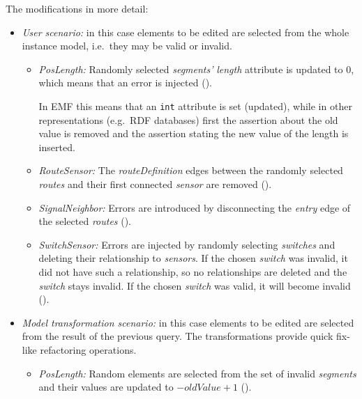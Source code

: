 The modifications in more detail:
\begin{itemize}
  \item \emph{User scenario:} in this case elements to be edited are selected from the whole instance model, i.e.\ they may be valid or invalid. 
  \begin{itemize}
    
    \item \emph{PosLength:} Randomly selected \emph{segments'} \emph{length} attribute is updated to 0, which means that an error is injected ().
    
    In EMF this means that an \texttt{int} attribute is set (updated), while in other representations (e.g.\ RDF databases) first the assertion about the old value is removed and the assertion stating the new value of the length is inserted.
    
    \item \emph{RouteSensor:} The \emph{routeDefinition} edges between the randomly selected \emph{routes} and their first connected \emph{sensor} are removed ().
    
    \item \emph{SignalNeighbor:} Errors are introduced by disconnecting the \emph{entry} edge of the selected \emph{routes} ().

    \item \emph{SwitchSensor:} Errors are injected by randomly selecting \emph{switches} and deleting their relationship to \emph{sensors}. If the chosen \emph{switch} was invalid, it did not have such a relationship, so no relationships are deleted and the \emph{switch} stays invalid. If the chosen \emph{switch} was valid, it will become invalid ().
        
  \end{itemize}
  \item \emph{Model transformation scenario:} in this case elements to be edited are selected from the result of the previous query. The transformations provide quick fix-like refactoring operations.
  \begin{itemize}
    
    \item \emph{PosLength:} Random elements are selected from the set of invalid \emph{segments} and their values are updated to $- \mathit{oldValue} + 1$ ().
    

\end{itemize}
\end{itemize}
